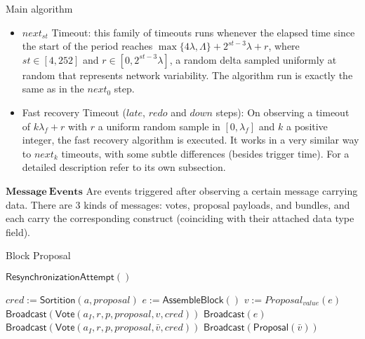 \documentclass[10pt,a4paper]{article}
\begin{document}
\begin{section}{Main algorithm}
\begin{itemize}
    \item $next_{st}$ Timeout: this family of timeouts runs whenever the elapsed time since the start of the period reaches
    $\max\{4\lambda, \Lambda \} + 2^{st-3}\lambda + r$, where $st\in [4, 252]$ and $r \in [0, 2^{st-3}\lambda]$, a random 
    delta sampled uniformly at random that represents network variability.
    The algorithm run is exactly the same as in the $next_0$ step.

    \item Fast recovery Timeout ($late$, $redo$ and $down$ steps): On observing a timeout of $k\lambda_f + r$ with $r$ a uniform random sample in $[0, \lambda_f]$ and
    $k$ a positive integer, the fast recovery algorithm is executed. It works in a very similar way to $next_k$ timeouts, with some subtle differences (besides trigger time).
    For a detailed description refer to its own subsection.
\end{itemize}


$\mathbf{Message \ Events}$ Are events triggered after observing a certain message carrying data.
There are 3 kinds of messages: votes, proposal payloads, and bundles, and each carry
the corresponding construct (coinciding with their attached data type field).

\begin{subsection}{Block Proposal}\label{ssect:blockproposal}

    \begin{algorithm}
        \caption{\underline{Block Proposal}}
        \label{algo:block-proposal}
        \begin{algorithmic}[1]

            \State $\mathsf{ResynchronizationAttempt}()$

                \State $cred :=  \mathsf{Sortition}(a, proposal)$
                        \State $e := \mathsf{AssembleBlock}()$
                        \State $v := Proposal_{value}(e)$
                        \State $\mathsf{Broadcast}(\mathsf{Vote}(a_I, r, p, proposal, v, cred))$
                        \State $\mathsf{Broadcast}(e)$
                    \Else
                        \State $\mathsf{Broadcast}(\mathsf{Vote}(a_I, r, p, proposal, \bar{v}, cred))$
                            \State $\mathsf{Broadcast}(\mathsf{Proposal}(\bar{v}))$
                        \EndIf
                    \EndIf
                \EndIf
            \EndFor
        \EndFunction
        \end{algorithmic}
    \end{algorithm}


\end{subsection}
\end{section}
\end{document}
